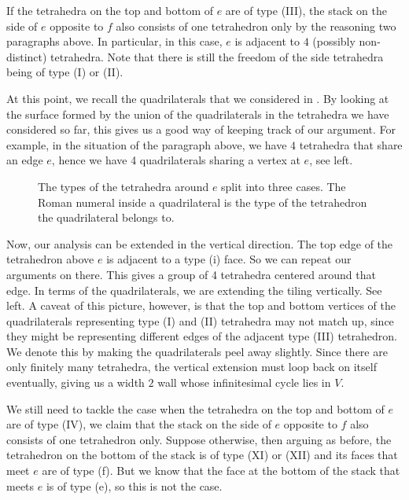 \documentclass[12pt]{amsart}
\theoremstyle{definition}
\numberwithin{equation}{section}
\begin{document}
If the tetrahedra on the top and bottom of $e$ are of type (III), the stack on the side of $e$ opposite to $f$ also consists of one tetrahedron only by the reasoning two paragraphs above. In particular, in this case, $e$ is adjacent to $4$ (possibly non-distinct) tetrahedra. Note that there is still the freedom of the side tetrahedra being of type (I) or (II).

At this point, we recall the quadrilaterals that we considered in . By looking at the surface formed by the union of the quadrilaterals in the tetrahedra we have considered so far, this gives us a good way of keeping track of our argument. For example, in the situation of the paragraph above, we have $4$ tetrahedra that share an edge $e$, hence we have 4 quadrilaterals sharing a vertex at $e$, see  left.

\begin{figure}
    \centering
    \fontsize{14pt}{14pt}\selectfont
    \resizebox{!}{4cm}{}
    \caption{The types of the tetrahedra around $e$ split into three cases. The Roman numeral inside a quadrilateral is the type of the tetrahedron the quadrilateral belongs to.}
    \label{fig:wallarg1}
\end{figure}

Now, our analysis can be extended in the vertical direction. The top edge of the tetrahedron above $e$ is adjacent to a type (i) face. So we can repeat our arguments on there. This gives a group of 4 tetrahedra centered around that edge. In terms of the quadrilaterals, we are extending the tiling vertically. See  left. A caveat of this picture, however, is that the top and bottom vertices of the quadrilaterals representing type (I) and (II) tetrahedra may not match up, since they might be representing different edges of the adjacent type (III) tetrahedron. We denote this by making the quadrilaterals peel away slightly. Since there are only finitely many tetrahedra, the vertical extension must loop back on itself eventually, giving us a width $2$ wall whose infinitesimal cycle lies in $V$.

We still need to tackle the case when the tetrahedra on the top and bottom of $e$ are of type (IV), we claim that the stack on the side of $e$ opposite to $f$ also consists of one tetrahedron only. Suppose otherwise, then arguing as before, the tetrahedron on the bottom of the stack is of type (XI) or (XII) and its faces that meet $e$ are of type (f). But we know that the face at the bottom of the stack that meets $e$ is of type (e), so this is not the case. 
\end{document}
